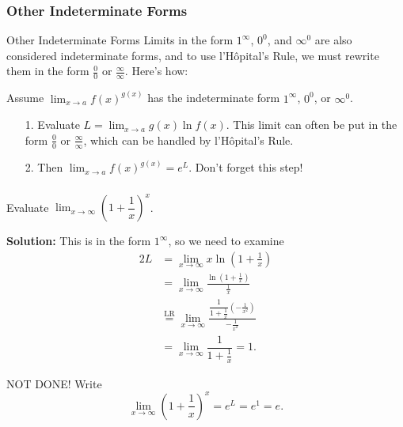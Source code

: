 \documentclass[cal1spr16Lectures.tex]{subfiles}
\begin{document}
\subsubsection{Other Indeterminate Forms}

\begin{frame}{\small Other Indeterminate Forms}
\footnotesize
Limits in the form $1^{\infty}$, $0^0$, and $\infty^0$ are also considered indeterminate forms, and to use l'H\^{o}pital's Rule, we must rewrite them in the form $\frac{0}{0}$ or $\frac{\infty}{\infty}$.  Here's how:

\vspace{1pc}
Assume $\displaystyle\lim_{x \to a} f(x)^{g(x)}$ has the indeterminate form $1^{\infty}$, $0^0$, or $\infty^0$.
\begin{itemize}
\item[1.] Evaluate $L=\displaystyle\lim_{x \to a} g(x) \ln f(x)$.  This limit can often be put in the form $\frac{0}{0}$ or $\frac{\infty}{\infty}$, which can be handled by l'H\^{o}pital's Rule.
\item[2.] Then $\displaystyle\lim_{x \to a} f(x)^{g(x)}=e^L$. \alert{Don't forget this step!}
\end{itemize}
\end{frame}

\begin{frame}
\frametitle{}
\small
\begin{ex} Evaluate $\displaystyle\lim_{x \to \infty} \left( 1+\dfrac{1}{x} \right)^x$. \end{ex}
\footnotesize
{\bf Solution:}  This is in the form $1^{\infty}$, so we need to examine
\begin{alignat*}{2}
L &= \lim_{x \to \infty} x \ln \left( 1 + \frac{1}{x} \right) \\
 &= \lim_{x \to \infty} \frac{\ln \left( 1 + \frac{1}{x} \right)}{ \frac{1}{x}} \\
 &\overset{\text{LR}}{=} \lim_{x \to \infty} \frac{ \dfrac{1}{1+ \frac{1}{x}}\left(-\frac{1}{x^2}\right) }{- \frac{1}{x^2}} \\ 
&= \lim_{x \to \infty} \dfrac{1}{1+ \frac{1}{x}} = 1.
\end{alignat*}
\end{frame}

\begin{frame}
NOT DONE!  Write
\[\lim_{x \to \infty} \left( 1+\dfrac{1}{x} \right)^x = e^L = e^1 = e.\]
\end{frame}
\end{document}

